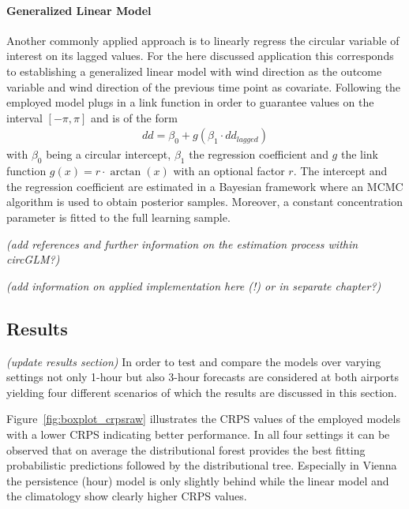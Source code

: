 \documentclass[nojss]{jss}
\newcommand{\fixme}[1]{\emph{\marginpar{FIXME} (#1)}}
\numberwithin{equation}{section}
\begin{document}
\paragraph{Generalized Linear Model}
Another commonly applied approach is to linearly regress the circular variable of interest on
its lagged values. For the here discussed application this corresponds to establishing a generalized
linear model with wind direction as the outcome variable and wind direction of the previous time point 
as covariate. 
Following \cite{Mulder+Klugkist:2017} the employed model plugs in a link function in order
to guarantee values on the interval $[-\pi,\pi]$ and is of the form
\begin{align}
dd = \beta_0 + g(\beta_1 \cdot dd_{lagged})
\end{align}
with $\beta_0$ being a circular intercept, $\beta_1$ the regression coefficient and 
$g$ the link function $g(x) = r \cdot \arctan(x)$ with an optional factor $r$. 
The intercept and the regression coefficient are estimated in a Bayesian framework where an 
MCMC algorithm is used to obtain posterior samples. Moreover, a constant concentration
parameter is fitted to the full learning sample.


\fixme{add references and further information on the estimation process within circGLM?}

\fixme{add information on applied implementation here (!) or in separate chapter?}





\subsection{Results}
\fixme{update results section}
In order to test and compare the models over varying settings not only 1-hour but also 3-hour
forecasts are considered at both airports yielding four different scenarios of which the results
are discussed in this section.

Figure~\ref{fig:boxplot_crpsraw} illustrates the CRPS values of the employed models with a lower 
CRPS indicating better performance. 
In all four settings it can be observed that on average the distributional forest provides the best 
fitting probabilistic predictions followed by the distributional tree. Especially in Vienna the 
persistence (hour) model is only slightly behind while the linear model and the climatology
show clearly higher CRPS values.
\end{document}
